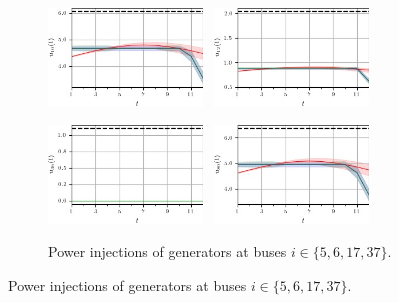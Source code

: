 \documentclass[final,3p,times,twocolumn]{elsarticle}  %
\begin{document}
\newpage

\begin{figure}
	\centering
	
    \begin{subfigure}[c]{\figwidth}
    \centering
        \includegraphics[width=0.45\textwidth]{figures/time series/case118_volatile/gen_u_4105.jpg}~
    	\includegraphics[width=0.45\textwidth]{figures/time series/case118_volatile/gen_u_4106.jpg}%
    	
    	\includegraphics[width=0.45\textwidth]{figures/time series/case118_volatile/gen_u_4117.jpg}~
    	\includegraphics[width=0.45\textwidth]{figures/time series/case118_volatile/gen_u_4137.jpg}%
    	\vspace{-2mm}	
    	\caption{Power injections of generators at buses $i \in \{5,6,17,37\}$.}
    \end{subfigure}
    
    

\end{figure}
\end{document}
